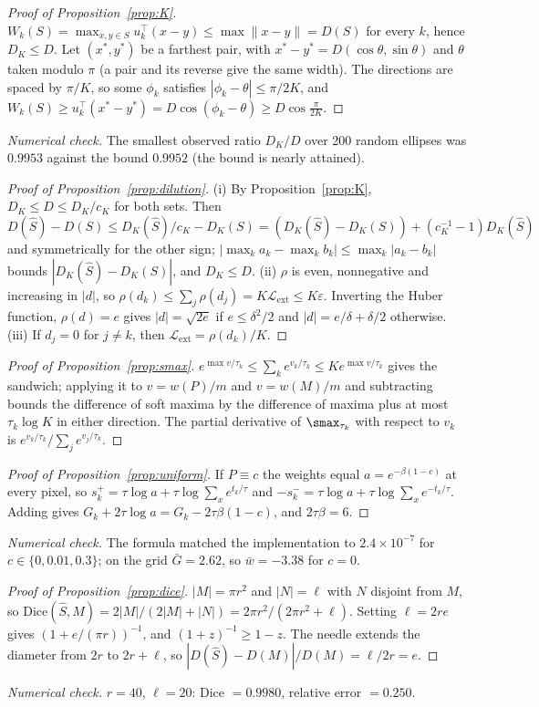 \begin{proof}[Proof of Proposition~\ref{prop:K}]
$W_k(S)=\max_{x,y\in S}u_k^\top(x-y)\le\max\|x-y\|=D(S)$ for every $k$, hence $D_K\le D$. Let $(x^\ast,y^\ast)$ be a farthest pair, with $x^\ast-y^\ast=D(\cos\theta,\sin\theta)$ and $\theta$ taken modulo $\pi$ (a pair and its reverse give the same width). The directions are spaced by $\pi/K$, so some $\phi_k$ satisfies $|\phi_k-\theta|\le\pi/2K$, and $W_k(S)\ge u_k^\top(x^\ast-y^\ast)=D\cos(\phi_k-\theta)\ge D\cos\frac{\pi}{2K}$.
\end{proof}
\emph{Numerical check.} The smallest observed ratio $D_K/D$ over 200 random ellipses was $0.9953$ against the bound $0.9952$ (the bound is nearly attained).

\begin{proof}[Proof of Proposition~\ref{prop:dilution}]
(i) By Proposition~\ref{prop:K}, $D_K\le D\le D_K/c_K$ for both sets. Then $D(\hat S)-D(S)\le D_K(\hat S)/c_K-D_K(S)=(D_K(\hat S)-D_K(S))+(c_K^{-1}-1)D_K(\hat S)$ and symmetrically for the other sign; $|\max_ka_k-\max_kb_k|\le\max_k|a_k-b_k|$ bounds $|D_K(\hat S)-D_K(S)|$, and $D_K\le D$. (ii) $\rho$ is even, nonnegative and increasing in $|d|$, so $\rho(d_k)\le\sum_j\rho(d_j)=K\mathcal{L}_{\mathrm{ext}}\le K\varepsilon$. Inverting the Huber function, $\rho(d)=e$ gives $|d|=\sqrt{2e}$ if $e\le\delta^2/2$ and $|d|=e/\delta+\delta/2$ otherwise. (iii) If $d_j=0$ for $j\ne k$, then $\mathcal{L}_{\mathrm{ext}}=\rho(d_k)/K$.
\end{proof}

\begin{proof}[Proof of Proposition~\ref{prop:smax}]
$e^{\max v/\tau_k}\le\sum_ke^{v_k/\tau_k}\le Ke^{\max v/\tau_k}$ gives the sandwich; applying it to $v=w(P)/m$ and $v=w(M)/m$ and subtracting bounds the difference of soft maxima by the difference of maxima plus at most $\tau_k\log K$ in either direction. The partial derivative of $\smax_{\tau_k}$ with respect to $v_k$ is $e^{v_k/\tau_k}/\sum_je^{v_j/\tau_k}$.
\end{proof}

\begin{proof}[Proof of Proposition~\ref{prop:uniform}]
If $P\equiv c$ the weights equal $a=e^{-\beta(1-c)}$ at every pixel, so $s_k^{+}=\tau\log a+\tau\log\sum_xe^{t_k/\tau}$ and $-s_k^{-}=\tau\log a+\tau\log\sum_xe^{-t_k/\tau}$. Adding gives $G_k+2\tau\log a=G_k-2\tau\beta(1-c)$, and $2\tau\beta=6$.
\end{proof}
\emph{Numerical check.} The formula matched the implementation to $2.4\times10^{-7}$ for $c\in\{0,0.01,0.3\}$; on the grid $\bar G=2.62$, so $\bar w=-3.38$ for $c=0$.

\begin{proof}[Proof of Proposition~\ref{prop:dice}]
$|M|=\pi r^2$ and $|N|=\ell$ with $N$ disjoint from $M$, so $\mathrm{Dice}(\hat S,M)=2|M|/(2|M|+|N|)=2\pi r^2/(2\pi r^2+\ell)$. Setting $\ell=2re$ gives $(1+e/(\pi r))^{-1}$, and $(1+z)^{-1}\ge1-z$. The needle extends the diameter from $2r$ to $2r+\ell$, so $|D(\hat S)-D(M)|/D(M)=\ell/2r=e$.
\end{proof}
\emph{Numerical check.} $r=40$, $\ell=20$: Dice $=0.9980$, relative error $=0.250$.

